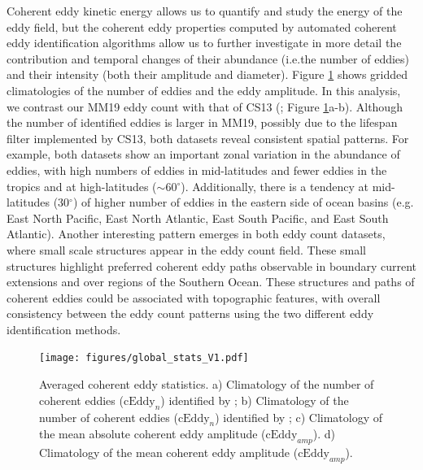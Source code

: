 \documentclass[draft,linenumbers]{agujournal2019}
\newcommand{\cEddy}{\textrm{cEddy}}
\begin{document}
	Coherent eddy kinetic energy allows us to quantify and study the energy of the eddy field, but the coherent eddy properties computed by automated coherent eddy identification algorithms allow us to further investigate in more detail the contribution and temporal changes of their abundance (i.e.the number of eddies) and their intensity (both their amplitude and diameter). 
	Figure \ref{fig:eddy_stats_climatology} shows gridded climatologies of the number of eddies and the eddy amplitude. 
	In this analysis, we contrast our MM19 eddy count with that of CS13 (\citealp{Chelton_Global_2007}; Figure \ref{fig:eddy_stats_climatology}a-b). Although the number of identified eddies is larger in MM19, possibly due to the lifespan filter implemented by CS13, both datasets reveal consistent spatial patterns. 
	For example, both datasets show an important zonal variation in the abundance of eddies, with high numbers of eddies in mid-latitudes and fewer eddies in the tropics and at high-latitudes ($\sim$60$^\circ$). Additionally, there is a tendency at mid-latitudes (30$^\circ$) of higher number of eddies in the eastern side of ocean basins (e.g. East North Pacific, East North Atlantic, East South Pacific, and East South Atlantic). 
	Another interesting pattern emerges in both eddy count datasets, where small scale structures appear in the eddy count field. 
	These small structures highlight preferred coherent eddy paths observable in boundary current extensions and over regions of the Southern Ocean. 
	These structures and paths of coherent eddies could be associated with topographic features, with overall consistency between the eddy count patterns using the two different eddy identification methods.
	
	\begin{figure}
	    \centering
	    \texttt{[image: figures/global\_stats\_V1.pdf]}
	    \caption{Averaged coherent eddy statistics. a) Climatology of the number of coherent eddies ($\cEddy_n$) identified by \citet{Chelton_Global_2007};  b) Climatology of the number of coherent eddies ($\cEddy_n$) identified by \citet{Martinez_TKE_2019}; c) Climatology of the mean absolute coherent eddy amplitude ($\cEddy_{amp}$). d) Climatology of the mean coherent eddy amplitude ($\cEddy_{amp}$).}
	    \label{fig:eddy_stats_climatology}
	\end{figure}
	
\end{document}
